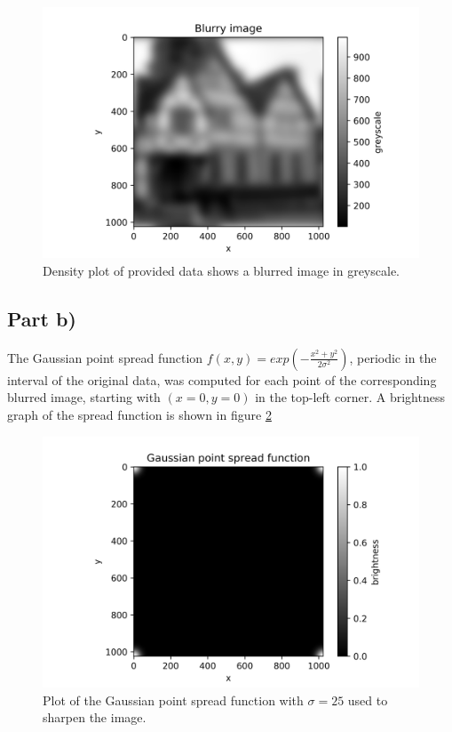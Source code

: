 \documentclass{article}
\begin{document}
\begin{figure}[H]
	\centering
	\includegraphics{../images/blurred_image.png}
	\caption{Density plot of provided data shows a blurred image in greyscale.}
	\label{fig:blurred_image}	
\end{figure}

\subsection{Part b)}
The Gaussian point spread function $f(x,y) = exp(-\frac{x^2+y^2}{2\sigma^2})$, periodic in the interval of the original data, was computed for each point of the corresponding blurred image, starting with $(x=0,y=0)$ in the top-left corner. A brightness graph of the spread function is shown in figure \ref{fig:spread_func}

\begin{figure}[H]
	\centering
	\includegraphics{../images/spread_function.png}
	\caption{Plot of the Gaussian point spread function with $\sigma=25$ used to sharpen the image.}
	\label{fig:spread_func}	
\end{figure}
\end{document}
